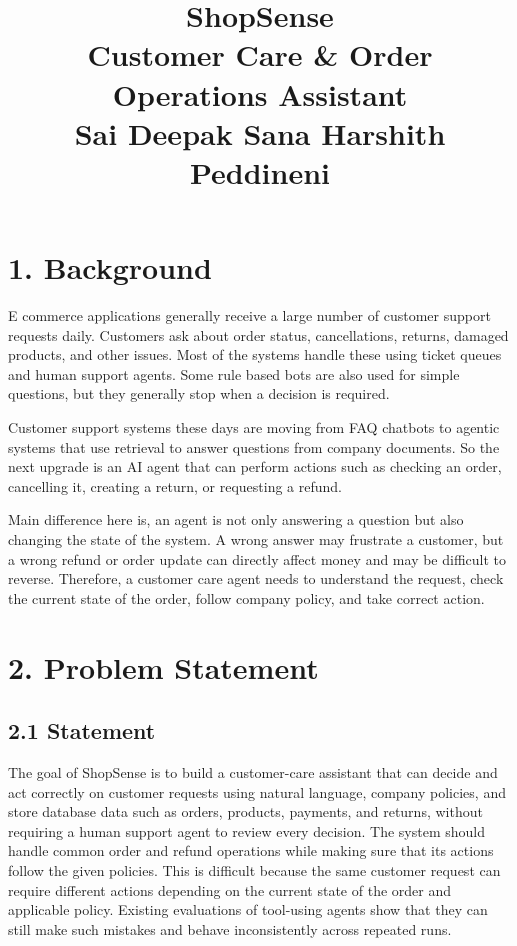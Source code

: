 \documentclass[11pt,a4paper]{article}
\title{\vspace{-2.4cm}\textbf{ShopSense}\\[6pt]
       \large Customer Care \& Order Operations Assistant \\[9pt]
       Sai Deepak Sana \quad Harshith Peddineni}
\author{}
\date{}
\begin{document}
\maketitle
\vspace{-1.0cm}

\section*{1. Background}

E commerce applications generally receive a large number of customer support requests daily. Customers ask about order status, cancellations, returns, damaged products, and other issues. Most of the systems handle these using ticket queues and human support agents. Some rule based bots are also used for simple questions, but they generally stop when a decision is required.

Customer support systems these days are moving from FAQ chatbots to agentic systems that use retrieval to answer questions from company documents. So the next upgrade is an AI agent that can perform actions such as checking an order, cancelling it, creating a return, or requesting a refund.

Main difference here is, an agent is not only answering a question but also changing the state of the system. A wrong answer may frustrate a customer, but a wrong refund or order update can directly affect money and may be difficult to reverse. Therefore, a customer care agent needs to understand the request, check the current state of the order, follow company policy, and take correct action.

\section*{2. Problem Statement}

\subsection*{2.1 Statement}

The goal of ShopSense is to build a customer-care assistant that can decide and act correctly on customer requests using natural language, company policies, and store database data such as orders, products, payments, and returns, without requiring a human support agent to review every decision. The system should handle common order and refund operations while making sure that its actions follow the given policies. This is difficult because the same customer request can require different actions depending on the current state of the order and applicable policy. Existing evaluations of tool-using agents show that they can still make such mistakes and behave inconsistently across repeated runs. \cite{taubench}
\end{document}
